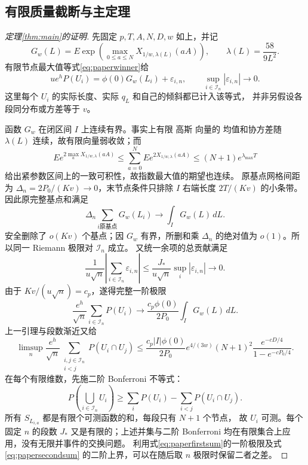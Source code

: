 \documentclass[UTF8,a4paper,11pt,fontset=fandol]{ctexart}
\theoremstyle{remark}
\begin{document}
\subsection{有限质量截断与主定理}
\begin{proof}[定理\ref{thm:main}的证明]
先固定 $p,T,A,N,D,w$ 如上，并记
\[
 G_w(L)=E\exp\!\left(\max_{0\le a\le N}
 X_{1/w,\lambda(L)}(aA)\right),\qquad
 \lambda(L)=\frac{58}{9L^2}.
\]
有限节点最大值等式\eqref{eq:paperwinner}给
\[
 ue^hP(U_i)=\phi(0)G_w(L_i)+\varepsilon_{i,n},
 \qquad\sup_{i\in\mathcal I_n}|\varepsilon_{i,n}|\longrightarrow0.
\]
这里每个 $U_i$ 的实际长度、实际 $q_{L}$ 和自己的倾斜都已计入该等式，
并非另假设各段同分布或方差等于 $v$。

函数 $G_w$ 在闭区间 $I$ 上连续有界。事实上有限 高斯 向量的
均值和协方差随 $\lambda(L)$ 连续，故有限向量弱收敛；而
\[
 E e^{2\max_aX_{1/w,\lambda}(aA)}
 \le\sum_{a=0}^NEe^{2X_{1/w,\lambda}(aA)}
 \le(N+1)e^{\lambda_{\max}T}
\]
给出紧参数区间上的一致可积性，故指数最大值的期望也连续。
原基点网格间距为 $\Delta_n=2P_0/(Kv)\to0$，末节点条件只排除
$I$ 右端长度 $2T/(Kv)$ 的小条带。因此原完整基点和满足
\[
 \Delta_n\sum_{i\text{原基点}}G_w(L_i)\longrightarrow\int_I G_w(L)\,dL.
\]
安全删除了 $o(Kv)$ 个基点；因 $G_w$ 有界，所删和乘 $\Delta_n$
的绝对值为 $o(1)$。所以同一 Riemann 极限对 $\mathcal I_n$ 成立。
又统一余项的总贡献满足
\[
 \frac1{u\sqrt n}\left|\sum_{i\in\mathcal I_n}\varepsilon_{i,n}\right|
 \le\frac{J_*}{u\sqrt n}\sup_i|\varepsilon_{i,n}|\longrightarrow0.
\]
由于 $Kv/(u\sqrt n)=c_p$，遂得完整一阶极限
\begin{equation}\label{eq:paperfirstsum}
 \frac{e^h}{\sqrt n}\sum_{i\in\mathcal I_n}P(U_i)
 \longrightarrow\frac{c_p\phi(0)}{2P_0}\int_I G_w(L)\,dL.
\end{equation}
上一引理与段数渐近又给
\begin{equation}\label{eq:papersecondsum}
 \limsup_n\frac{e^h}{\sqrt n}
 \sum_{\substack{i,j\in\mathcal I_n\\i<j}}P(U_i\cap U_j)
 \le\frac{c_p|I|\phi(0)}{2P_0}e^{4/(3w)}(N+1)^2
 \frac{e^{-cD/4}}{1-e^{-cP_0/4}}.
\end{equation}
在每个有限维数，先施二阶 Bonferroni 不等式：
\[
 P\left(\bigcup_{i\in\mathcal I_n}U_i\right)
 \ge\sum_iP(U_i)-\sum_{i<j}P(U_i\cap U_j).
\]
所有 $S_{L_{i,a}}$ 都是有限个可测函数的和，每段只有 $N+1$ 个节点，
故 $U_i$ 可测。每个固定 $n$ 的段数 $J_*$ 又是有限的；上述并集与二阶
Bonferroni 均在有限集合上应用，没有无限并事件的交换问题。
利用式\eqref{eq:paperfirstsum}的一阶极限及式\eqref{eq:papersecondsum}
的二阶上界，可以在随后取 $n$ 极限时保留二者之差。


\end{proof}
\end{document}
